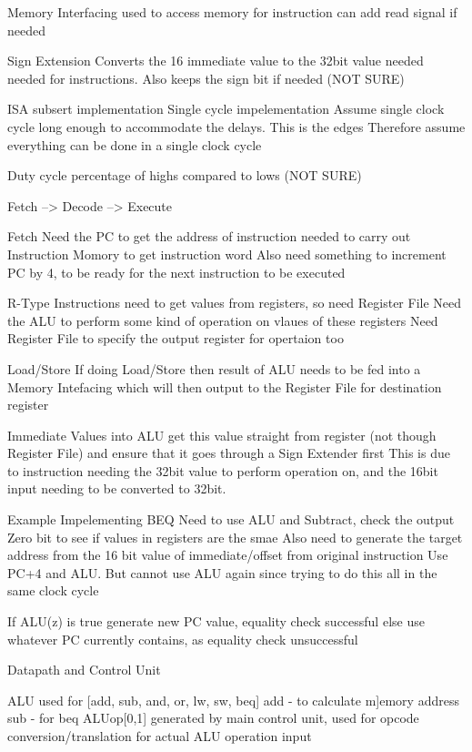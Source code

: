 \documentclass{article}
\begin{document}
		Memory Interfacing
			used to access memory for instruction
			can add read signal if needed

		Sign Extension
			Converts the 16 immediate value to the 32bit value needed needed for instructions. Also keeps the sign bit if needed (NOT SURE)

	ISA subsert implementation
		Single cycle impelementation
			Assume single clock cycle long enough to accommodate the delays. This is the edges
			Therefore assume everything can be done in a single clock cycle

			Duty cycle
				percentage of highs compared to lows (NOT SURE)

		Fetch --> Decode --> Execute

		Fetch
			Need the PC to get the address of instruction needed to carry out
			Instruction Momory to get instruction word
			Also need something to increment PC by 4, to be ready for the next instruction to be executed

		R-Type Instructions
			need to get values from registers, so need Register File
			Need the ALU to perform some kind of operation on vlaues of these registers 
			Need Register File to specify the output register for opertaion too

		Load/Store
			If doing Load/Store then result of ALU needs to be fed into a Memory Intefacing which will then output to the Register File for destination register

		Immediate Values into ALU
			get this value straight from register (not though Register File) and ensure that it goes through a Sign Extender first
			This is due to instruction needing the 32bit value to perform operation on, and the 16bit input needing to be converted to 32bit.


	Example
		Impelementing BEQ
			Need to use ALU and Subtract, check the output Zero bit to see if values in registers are the smae
			Also need to generate the target address from the 16 bit value of immediate/offset from original instruction
				Use PC+4 and ALU. But cannot use ALU again since trying to do this all in the same clock cycle

			If ALU(z) is true
				generate new PC value, equality check successful
			else
				use whatever PC currently contains, as equality check unsuccessful

	Datapath and Control Unit

		ALU used for [add, sub, and, or, lw, sw, beq]
		add - to calculate m]emory address
		sub - for beq
		ALUop[0,1] generated by main control unit, used for opcode conversion/translation for actual ALU operation input
\end{document}

